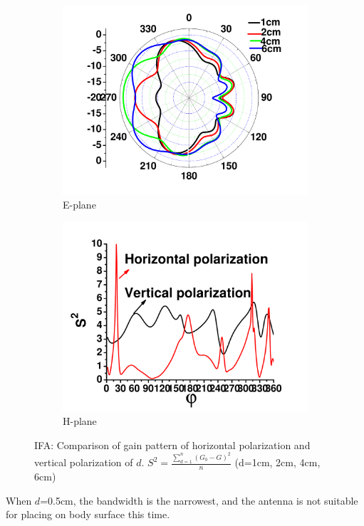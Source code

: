 \documentclass[journal]{IEEEtran}
\begin{document}
\begin{figure}[!htb]
\begin{subfigure}[b]{0.24\textwidth}
\includegraphics[width=\textwidth]{figs/6c.pdf}
\caption{E-plane}
\label{fig:6c}	
\end{subfigure}
\begin{subfigure}[b]{0.24\textwidth}
\includegraphics[width=\textwidth]{figs/6f.pdf}
\caption{H-plane}
\label{fig:6f}	
\end{subfigure}
\caption{IFA: Comparison of gain pattern of horizontal polarization and vertical polarization of $d$.
$S^2= \frac{\sum_{d=1}^n{({G_b-G})^2}}{n}$ (d=1cm, 2cm, 4cm, 6cm) }
\label{fig:6}
\end{figure}
When $d$=0.5cm, the bandwidth is the narrowest, and the antenna is not suitable for placing on body surface this time.
\end{document}
